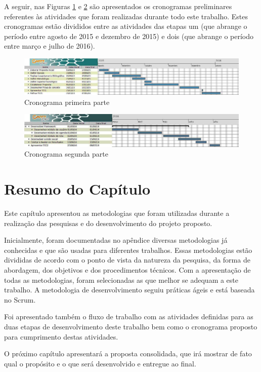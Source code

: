 A seguir, nas Figuras \ref{cronograma_parte_1} e \ref{cronograma_parte_2} são apresentados os cronogramas preliminares referentes às atividades que foram realizadas durante todo este trabalho. Estes cronogramas estão divididos entre as atividades das etapas um (que abrange o período entre agosto de 2015 e dezembro de 2015) e dois (que abrange o período entre março e julho de 2016).

\begin{figure}[h]
	\centering
	\includegraphics[scale=0.4]{figuras/capitulo4/gant1.eps}
	\caption{Cronograma primeira parte}
	\label{cronograma_parte_1}
\end{figure}

\begin{figure}[h]
	\centering
	\includegraphics[scale=0.4]{figuras/capitulo4/gant2.eps}
	\caption{Cronograma segunda parte}
	\label{cronograma_parte_2}
\end{figure}

\section{Resumo do Capítulo}

Este capítulo apresentou as metodologias que foram utilizadas durante a realização das pesquisas e do desenvolvimento do projeto proposto.

Inicialmente, foram documentadas no apêndice diversas metodologias já conhecidas e que são usadas para diferentes trabalhos. Essas metodologias estão divididas de acordo com o ponto de vista da natureza da pesquisa, da forma de abordagem, dos objetivos e dos procedimentos técnicos. Com a apresentação de todas as metodologias, foram selecionadas as que melhor se adequam a este trabalho. A metodologia de desenvolvimento seguiu práticas ágeis e está baseada no Scrum.

Foi apresentado também o fluxo de trabalho com as atividades definidas para as duas etapas de desenvolvimento deste trabalho bem como o cronograma proposto para cumprimento destas atividades.

O próximo capítulo apresentará a proposta consolidada, que irá mostrar de fato qual o propósito e o que será desenvolvido e entregue ao final.
